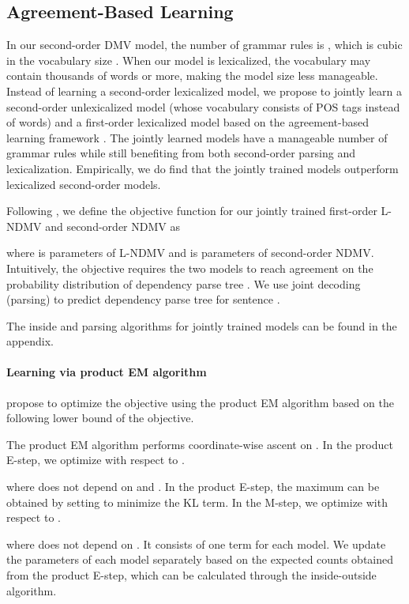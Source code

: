 \documentclass[11pt]{article}
\begin{document}
\subsection{Agreement-Based Learning}
In our second-order DMV model, the number of grammar rules is , which is cubic in the vocabulary size . When our model is lexicalized, the vocabulary may contain thousands of words or more, making the model size less manageable. Instead of learning a second-order lexicalized model, we propose to jointly learn a second-order unlexicalized model (whose vocabulary consists of POS tags instead of words) and a first-order lexicalized model based on the agreement-based learning framework \cite{Liang2007AgreementBasedL}. The jointly learned models have a manageable number of grammar rules while still benefiting from both second-order parsing and lexicalization. Empirically, we do find that the jointly trained models outperform lexicalized second-order models. 
 
Following , we define the objective function for our jointly trained first-order L-NDMV and second-order NDMV as

where  is parameters of L-NDMV and  is parameters of second-order NDMV. Intuitively, the objective requires the two models to reach agreement on the probability distribution of dependency parse tree . We use joint decoding (parsing) to predict dependency parse tree  for sentence .
 
The inside and parsing algorithms for jointly trained models can be found in the appendix.

\paragraph{Learning via product EM algorithm} 
 propose to optimize the objective using the product EM algorithm based on the following lower bound of the objective.

The product EM algorithm performs coordinate-wise ascent on .   In the product E-step, we optimize  with respect to .
  
where  does not depend on  and .  In the product E-step, the maximum can be obtained  by setting  to minimize the KL term.
In the M-step, we optimize  with respect to .

where  does not depend on . It consists of one term for each model. We update the parameters of each model separately based on the expected counts obtained from the product E-step, which can be calculated through the inside-outside algorithm.
\end{document}
